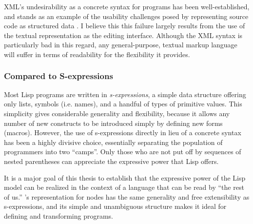 XML's undesirability as a concrete syntax for programs has been well-established, and stands as an example of the usability challenges posed by representing source code as structured data \cite{holub}\cite{xml-bad-ant}. I believe this this failure largely results from the use of the textual representation as the editing interface. Although the XML syntax is particularly bad in this regard, any general-purpose, textual markup language will suffer in terms of readability for the flexibility it provides.

\subsubsection{Compared to S-expressions}
Most Lisp programs are written in \emph{s-expressions}, a simple data structure offering only lists, symbols (i.e. names), and a handful of types of primitive values. This simplicity gives considerable generality and flexibility, because it allows any number of new constructs to be introduced simply by defining new forms (macros). However, the use of s-expressions directly in lieu of a concrete syntax has been a highly divisive choice, essentially separating the population of programmers into two ``camps''. Only those who are not put off by sequences of nested parentheses can appreciate the expressive power that Lisp offers.

It is a major goal of this thesis to establish that the expressive power of the Lisp model can be realized in the context of a language that can be read by ``the rest of us.'' \Meta's representation for nodes has the same generality and free extensibility as s-expressions, and its simple and unambiguous structure makes it ideal for defining and transforming programs.


